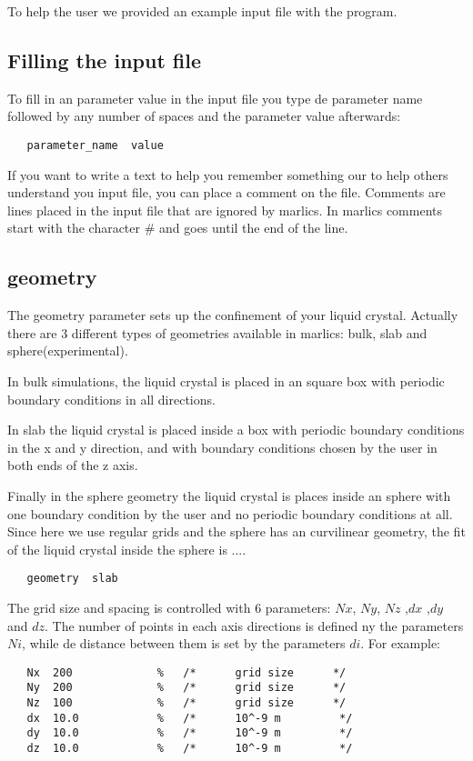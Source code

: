 \documentclass{article}
\begin{document}
To help the user we provided an example input file with the program.

\subsection{Filling the input file}

To fill in an parameter value in the input file you type de parameter name followed by any number of spaces and the parameter value afterwards:

\begin{lstlisting}
   parameter_name  value
\end{lstlisting}


If you want to write a text to help you remember something our to help others understand you input file, you can place a comment on the file. Comments are lines placed in the input file that are ignored by marlics. In marlics comments start with the character \# and goes until the end of the line.

\subsection{geometry}
The geometry parameter sets up the confinement of your liquid crystal. Actually there are 3 different types of geometries available in marlics: bulk, slab and sphere(experimental).

In bulk simulations, the liquid crystal is placed in an square box with periodic boundary conditions in all directions.

In slab the liquid crystal is placed inside a box with periodic boundary conditions in the x and y direction, and with boundary conditions chosen by the user in both ends of the z axis.

Finally in the sphere geometry the liquid crystal is places inside an sphere with one boundary condition  by the user and no periodic boundary conditions at all. Since here we use regular grids and the sphere has an curvilinear geometry, the fit of the liquid crystal inside the sphere is ....
\begin{lstlisting}
   geometry  slab
\end{lstlisting}

The grid size and spacing is controlled with 6 parameters: $Nx$, $Ny$, $Nz$ ,$dx$ ,$dy$ and $dz$. The number of points in each axis directions is defined ny the parameters $Ni$, while de distance between them is set by the parameters $di$. For example:
\begin{lstlisting}	
   Nx  200             %   /*      grid size      */
   Ny  200             %   /*      grid size      */
   Nz  100             %   /*      grid size      */
   dx  10.0            %   /*      10^-9 m         */
   dy  10.0            %   /*      10^-9 m         */
   dz  10.0            %   /*      10^-9 m         */
\end{lstlisting}
\end{document}
